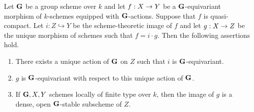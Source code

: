 \begin{theorem}\label{theorem:scheme_theoretic_images_of_equivariant_morphisms}
Let $\mathbf{G}$ be a group scheme over $k$ and let $f:X\rightarrow Y$ be a $\mathbf{G}$-equivariant morphism of $k$-schemes equipped with $\mathbf{G}$-actions. Suppose that $f$ is quasi-compact. Let $i:Z\hookrightarrow Y$ be the scheme-theoretic image of $f$ and let $g:X\rightarrow Z$ be the unique morphism of schemes such that $f = i\cdot g$. Then the following assertions hold.
\begin{enumerate}[label=\emph{\textbf{(\arabic*)}}, leftmargin=3.0em]
\item There exists a unique action of $\mathbf{G}$ on $Z$ such that $i$ is $\mathbf{G}$-equivariant.
\item $g$ is $\mathbf{G}$-equivariant with respect to this unique action of $\mathbf{G}$. 
\item If $\mathbf{G},X,Y$ schemes locally of finite type over $k$, then the image of $g$ is a dense, open $\mathbf{G}$-stable subscheme of $Z$.
\end{enumerate}
\end{theorem}
